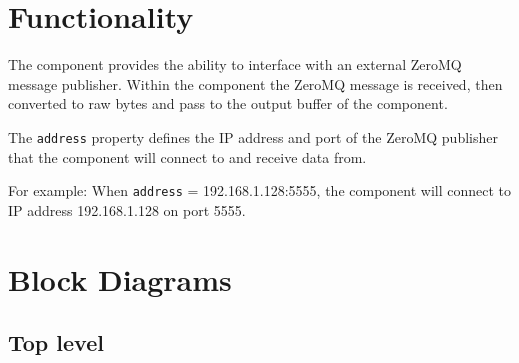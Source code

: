 \def\name{\comp}
\def\workertype{}
\def\version{\ocpiversion}
\def\releasedate{04/2021}
\def\componentlibrary{assets\_{}comps}
\def\workers{\comp{}.rcc}
\def\testedplatforms{ubuntu 18.04}

	
\section*{Functionality}
\begin{flushleft}

The {\comp} component provides the ability to interface with an external ZeroMQ message publisher. Within the {\comp} component the ZeroMQ message is received, then converted to raw bytes and pass to the output buffer of the component. \newline

The \texttt{address} property defines the IP address and port of the ZeroMQ publisher that the {\comp} component will connect to and receive data from.\newline

For example: \newline
When \texttt{address} = 192.168.1.128:5555, the {\comp} component will connect to IP address 192.168.1.128 on port 5555. \newline


\end{flushleft}

\section*{Block Diagrams}
	\subsection*{Top level}
\begin{center}
\end{center}


